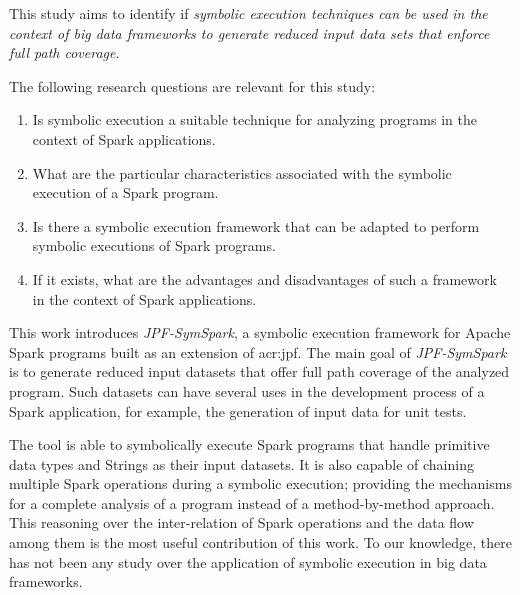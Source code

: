 \label{ch:introduction}








This study aims to identify if \textit{symbolic execution techniques can be used in the context of big data frameworks to generate reduced input data sets that enforce full path coverage}.


The following research questions are relevant for this study:

\begin{enumerate}
	\item Is symbolic execution a suitable technique for analyzing programs in the context of Spark applications.
	\item What are the particular characteristics associated with the symbolic execution of a Spark program.
	\item Is there a symbolic execution framework that can be adapted to perform symbolic executions of Spark programs.
	\item If it exists, what are the advantages and disadvantages of such a framework in the context of Spark applications.	
\end{enumerate}

\label{sec:contributions}

This work introduces \textit{JPF-SymSpark}, a symbolic execution framework for Apache Spark programs built as an extension of \acrfull{acr:jpf}. The main goal of \textit{JPF-SymSpark} is to generate reduced input datasets that offer full path coverage of the analyzed program. Such datasets can have several uses in the development process of a Spark application, for example, the generation of input data for unit tests.

The tool is able to symbolically execute Spark programs that handle primitive data types and Strings as their input datasets. It is also capable of chaining multiple Spark operations during a symbolic execution; providing the mechanisms for a complete analysis of a program instead of a method-by-method approach. This reasoning over the inter-relation of Spark operations and the data flow among them is the most useful contribution of this work. To our knowledge, there has not been any study over the application of symbolic execution in big data frameworks.

